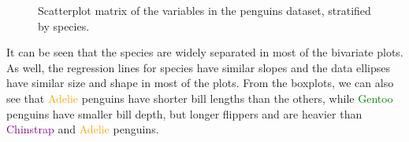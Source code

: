 \documentclass[
  letterpaper,
  10pt,
  krantz2]{krantz}
\begin{document}
\begin{figure}[H]


\caption{\label{fig-peng-spm}Scatterplot matrix of the variables in the
penguins dataset, stratified by species.}

\end{figure}%

It can be seen that the species are widely separated in most of the
bivariate plots. As well, the regression lines for species have similar
slopes and the data ellipses have similar size and shape in most of the
plots. From the boxplots, we can also see that
\textcolor{orange}{Adelie} penguins have shorter bill lengths than the
others, while \textcolor{green}{Gentoo} penguins have smaller bill
depth, but longer flippers and are heavier than
\textcolor{purple}{Chinstrap} and \textcolor{orange}{Adelie} penguins.
\end{document}
